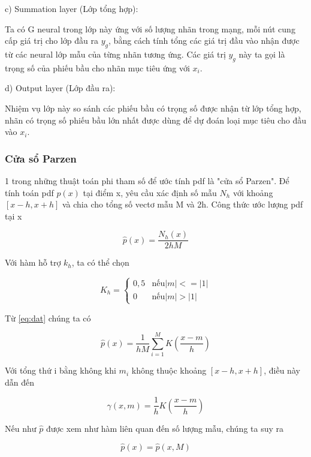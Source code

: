 c)	Summation layer (Lớp tổng hợp): 

Ta có G neural trong lớp này ứng với số lượng nhãn trong mạng, mỗi nút cung cấp giá trị cho lớp đầu ra $y_g$,  bằng cách tính tổng các giá trị đầu vào nhận được từ các neural lớp mẫu của từng nhãn tương ứng. Các giá trị $y_g$ này ta gọi là trọng số của phiếu bầu cho nhãn mục tiêu ứng với $x_i$.

d)	Output layer (Lớp đầu ra): 

Nhiệm vụ lớp này so sánh các phiếu bầu có trọng số được nhận từ lớp tổng hợp, nhãn có trọng số phiếu bầu lớn nhất được dùng để dự đoán loại mục tiêu cho đầu vào $x_i$.

\subsubsection{Cửa sổ Parzen}

1 trong những thuật toán phi tham số để ước tính \ac{pdf} là "cửa sổ Parzen". Để tính toán \ac{pdf} $p(x)$ tại điểm x, yêu cầu xác định số mẫu $N_h$ với khoảng $[x-h,x+h]$ và chia cho tổng số vectơ mẫu M và 2h. Công thức ước lượng \ac{pdf} tại x

\begin{equation}
	\hat{p}(x)=\dfrac{N_h(x)}{2hM}
	\label{eq:dat}
\end{equation}

Với hàm hỗ trợ $k_h$, ta có thể chọn


	$$
	K_h=
	\begin{cases}
		0,5 & \text{nếu} |m|<=|1|\\
	0 & \text{nếu} |m|>|1|
	\end{cases}
$$




Từ \eqref{eq:dat} chúng ta có

\begin{equation}
	\hat{p}(x)=\dfrac{1}{hM} \sum_{i=1}^{M} K(\dfrac{x-m}{h})
\end{equation}

Với tổng thứ i bằng không khi $m_i$ không thuộc khoảng $[x-h,x+h]$, điều này dẫn đến

\begin{equation}
	\gamma (x,m) = \dfrac{1}{h} K(\dfrac{x-m}{h})
\end{equation}

Nếu như $\hat{p}$ được xem như hàm liên quan đến số lượng mẫu, chúng ta suy ra

\begin{equation}
	\hat{p}(x)=\hat{p}(x,M)
\end{equation}

